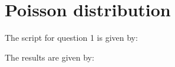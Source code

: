 \section{Poisson distribution}

The script for question 1 is given by:


The results are given by:

